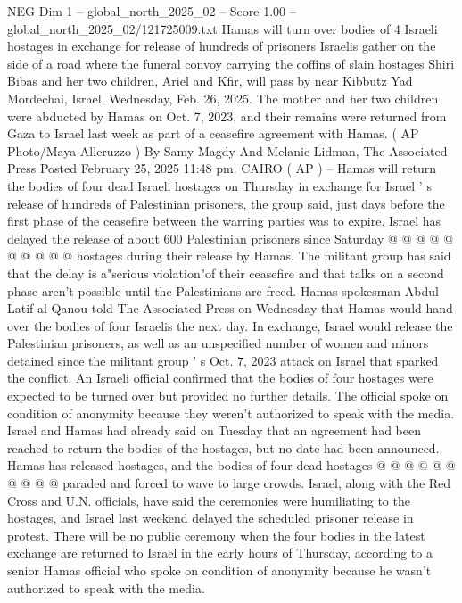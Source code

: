 \begin{textsample}{NEG Dim 1 – global\_north\_2025\_02 – Score 1.00 – global\_north\_2025\_02/121725009.txt}  \label{ex:f1_neg_008}
Hamas will turn over bodies of 4 Israeli hostages in exchange for release of hundreds of prisoners Israelis gather on the side of a road where the funeral convoy carrying the coffins of slain hostages Shiri Bibas and her two children, Ariel and Kfir, will pass by near Kibbutz Yad Mordechai, Israel, Wednesday, Feb. 26, 2025.
The mother and her two children were abducted by Hamas on Oct. 7, 2023, and their remains were returned from Gaza to Israel last week as part of a ceasefire agreement with Hamas. ( AP Photo/Maya Alleruzzo ) By Samy Magdy And Melanie Lidman, The Associated Press Posted February 25, 2025 11:48 pm.
CAIRO ( AP ) -- Hamas will return the bodies of four dead Israeli hostages on Thursday in exchange for Israel ' s release of hundreds of Palestinian prisoners, the group said, just days before the first phase of the ceasefire between the warring parties was to expire.
Israel has delayed the release of about 600 Palestinian prisoners since Saturday @ @ @ @ @ @ @ @ @ @ hostages during their release by Hamas.
The militant group has said that the delay is a"serious violation"of their ceasefire and that talks on a second phase aren't possible until the Palestinians are freed.
Hamas spokesman Abdul Latif al-Qanou told The Associated Press on Wednesday that Hamas would hand over the bodies of four Israelis the next day.
In exchange, Israel would release the Palestinian prisoners, as well as an unspecified number of women and minors detained since the militant group ' s Oct. 7, 2023 attack on Israel that sparked the conflict.
An Israeli official confirmed that the bodies of four hostages were expected to be turned over but provided no further details.
The official spoke on condition of anonymity because they weren't authorized to speak with the media.
Israel and Hamas had already said on Tuesday that an agreement had been reached to return the bodies of the hostages, but no date had been announced.
Hamas has released hostages, and the bodies of four dead hostages @ @ @ @ @ @ @ @ @ @ paraded and forced to wave to large crowds.
Israel, along with the Red Cross and U.N. officials, have said the ceremonies were humiliating to the hostages, and Israel last weekend delayed the scheduled prisoner release in protest.
There will be no public ceremony when the four bodies in the latest exchange are returned to Israel in the early hours of Thursday, according to a senior Hamas official who spoke on condition of anonymity because he wasn't authorized to speak with the media.

\end{textsample}
